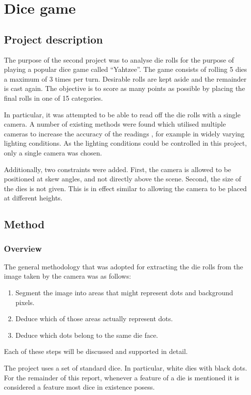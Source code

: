 \chapter {Dice game}
\section{Project description}

The purpose of the second project was to analyse die rolls for the purpose of playing a popular dice game called ``Yahtzee''. The game consists of rolling 5 dies a maximum of 3 times per turn. Desirable rolls are kept aside and the remainder is cast again. The objective is to score as many points as possible by placing the final rolls in one of 15 categories. 

In particular, it was attempted to be able to read off the die rolls with a single camera. A number of existing methods were found which utilised multiple cameras to increase the accuracy of the readings \cite{hsu2012color}, for example in widely varying lighting conditions. As the lighting conditions could be controlled in this project, only a single camera was chosen. 

Additionally, two constraints were added. First, the camera is allowed to be positioned at skew angles, and not directly above the scene. Second, the size of the dies is not given. This is in effect similar to allowing the camera to be placed at different heights.

\section{Method}
\subsection{Overview}
The general methodology that was adopted for extracting the die rolls from the image taken by the camera was as follows:
\begin{enumerate}
\item Segment the image into areas that might represent dots and background pixels.
\item Deduce which of those areas actually represent dots.
\item Deduce which dots belong to the same die face.
\end{enumerate}

Each of these steps will be discussed and supported in detail.

The project uses a set of standard dice. In particular, white dies with black dots. For the remainder of this report, whenever a feature of a die is mentioned it is considered a feature most dice in existence posess.

